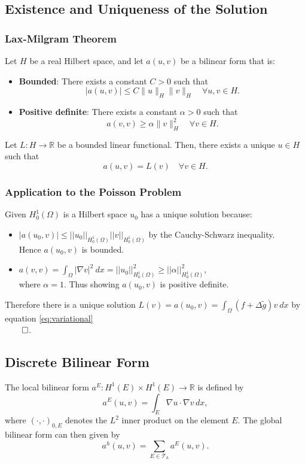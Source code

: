 \documentclass[class=article, crop=false]{standalone}
\begin{document}
\subsection{Existence and Uniqueness of the Solution}

\subsubsection{Lax-Milgram Theorem}
\begin{theorem}
    Let $H$ be a real Hilbert space, and let $a(u,v)$  be a bilinear form that is:
    \begin{itemize}
        \item \textbf{Bounded}: There exists a constant $C > 0$ such that
        $$
        |a(u, v)| \leq C \|u\|_H \|v\|_H \quad \forall u, v \in H.
        $$
        \item \textbf{Positive definite}: There exists a constant $\alpha > 0$ such that
        $$
        a(v, v) \geq \alpha \|v\|_H^2 \quad \forall v \in H.
        $$
    \end{itemize}
    Let $L: H \rightarrow \mathbb{R}$ be a bounded linear functional. Then, there exists a unique $u \in H$ such that
    $$
    a(u, v) = L(v) \quad \forall v \in H.
    $$
\end{theorem}

\subsubsection{Application to the Poisson Problem}
Given $H^1_0(\Omega)$ is a Hilbert space $u_0$ has a unique solution because:
\begin{itemize}
    \item $|a(u_0,v)| \leq ||u_0||_{H^1_0(\Omega)} ||v||_{H^1_0(\Omega)} $ by the Cauchy-Schwarz inequality.\\
    Hence $a(u_0,v)$ is bounded.

    \item $a(v,v) = \int_{\Omega}|\nabla v|^2\ dx = ||u_0||^2_{H_0^1(\Omega)} \geq ||\alpha||^2_{H_0^1(\Omega)}$,\\
    where $\alpha = 1.$ Thus showing $a(u_0,v)$ is positive definite.
\end{itemize}

Therefore there is a unique solution $L(v) = a(u_0,v) = \int_\Omega (f + \Delta\tilde{g})v\ dx$ by equation \eqref{eq:variational}\\
$\qed$.

\subsection{Discrete Bilinear Form}
The local bilinear form $a^E: H^1(E) \times H^1(E) \rightarrow \mathbb{R}$ is defined by
$$
a^E(u, v) = \int_E \nabla u \cdot \nabla v \, dx,
$$
where $(\cdot, \cdot)_{0,E}$ denotes the $L^2$ inner product on the element $E$. The global bilinear form can then given by
$$
a^h(u, v) = \sum_{E \in \mathcal{T}_h} a^E(u, v).
$$
\end{document}
